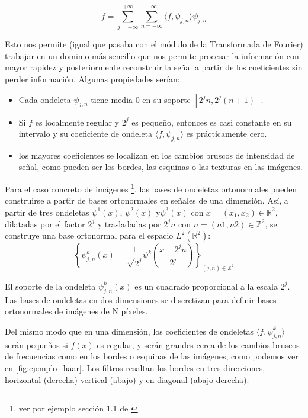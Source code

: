 $$f=\sum_{j=-\infty}^{+\infty}\sum_{n=-\infty}^{+\infty}  \langle f,\psi_{j,n} \rangle \psi_{j,n} $$

\noindent Esto nos permite (igual que pasaba con el módulo de la Transformada de Fourier) trabajar en un dominio más sencillo que nos permite procesar la información con mayor rapidez y posteriormente reconstruir la señal a partir de los coeficientes sin perder información. Algunas propiedades serían: 

\newpage

\begin{itemize}
  \item Cada ondeleta $\psi_{j,n}$ tiene media $0$ en su soporte $[2^jn, 2^j(n+1)]$.
  \item Si $f$ es localmente regular y $2^j$ es pequeño, entonces es casi constante en su intervalo y su coeficiente de ondeleta $\langle f,\psi_{j,n} \rangle$ es prácticamente cero.
  \item los mayores coeficientes se localizan en los cambios bruscos de intensidad de señal, como pueden ser los bordes, las esquinas o las texturas en las imágenes.
\end{itemize}

\noindent Para el caso concreto de imágenes \footnote{ver por ejemplo sección 1.1 de \cite{MallatWavelets}}, las bases de ondeletas ortonormales pueden construirse a partir de bases ortonormales en señales de una dimensión. Así, a partir de tres ondeletas $\psi^1(x)$, $\psi^2(x)$ y$\psi^3(x)$ con $x=(x_1,x_2)\in \mathbb{R}^2$, dilatadas por el factor $2^j$ y trasladadas por $2^jn$ con $n=(n1,n2)\in \mathbb{Z}^2$, se construye una base ortonormal para el espacio $L^2(\mathbb{R}^2)$: 
$$\left \lbrace \psi_{j,n}^k(x)= \frac{1}{\sqrt{2^j}} \psi^k\left(\frac{x-2^jn}{2^j}\right) \right \rbrace_{(j,n) \in \mathbb{Z}^2}$$

\medskip

\noindent El soporte de la ondeleta $\psi_{j,n}^k(x)$ es un cuadrado proporcional a la escala $2^j$. Las bases de ondeletas en dos dimensiones se discretizan para definir bases ortonormales de imágenes de N píxeles.


\noindent Del mismo modo que en una dimensión, los coeficientes de ondeletas $\langle f,\psi_{j,n}^k \rangle$ serán pequeños si $f(x)$ es regular, y serán grandes cerca de los cambios bruscos de frecuencias como en los bordes o esquinas de las imágenes, como podemos ver en \autoref{fig:ejemplo_haar}. Los filtros resaltan los bordes en tres direcciones, horizontal (derecha) vertical (abajo) y en diagonal (abajo derecha).

